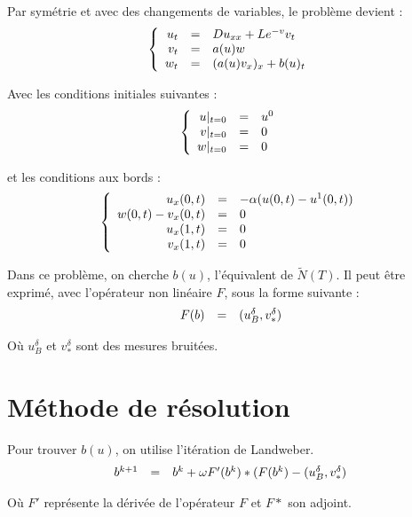 \documentclass[a4paper,10pt]{article}
\begin{document}
Par symétrie et avec des changements de variables, le problème devient :
\[
\left\{
\begin{array}{r c l}
u_t		&=&		D u_{xx} + L e^{-v} v_t		\\
v_t		&=&		a(u)w						\\
w_t		&=&		(a(u)v_x)_x + b(u)_t			\\
\end{array}
\right.
\]

Avec les conditions initiales suivantes :
\[
\left\{
\begin{array}{r c l}
u|_{t=0}		&=&		u^0		\\
v|_{t=0}		&=&		0		\\
w|_{t=0}		&=&		0		\\
\end{array}
\right.
\]

et les conditions aux bords :
\[
\left\{
\begin{array}{r c l c}
u_x(0, t)	&=&		-\alpha (u(0,t) - u^1(0, t)) 	\\
w(0, t)		- v_x(0, t)	&=&		0				 	\\
u_x(1,t)		&=&		0								\\
v_x(1,t)		&=&		0								\\
\end{array}
\right.
\]


Dans ce problème, on cherche $b(u)$, l'équivalent de $\widetilde{N}(T)$. Il peut \^etre exprimé, avec l'opérateur non linéaire $F$, sous la forme suivante :
\[
\begin{array}{r l c}
F(b)		&=&		(u^{\delta}_{B}, v^{\delta}_{*}) \\
\end{array}
\]

Où $u^{\delta}_{B}$ et $v^{\delta}_{*}$ sont des mesures bruitées.


\section{Méthode de résolution}

Pour trouver $b(u)$, on utilise l'itération de Landweber.
\[
\begin{array}{r l c}
b^{k+1} 	&=&	b^{k} +  \omega F'(b^k)*(F(b^k) - (u^{\delta}_{B}, v^{\delta}_{*}) \\
\end{array}
\]

Où $F'$ représente la dérivée de l'opérateur $F$ et $F*$ son adjoint.\\
\end{document}
